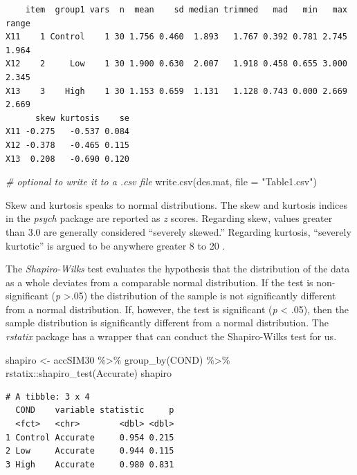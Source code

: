 \documentclass[
  11pt,
]{book}
\newenvironment{Shaded}{\begin{snugshade}}{\end{snugshade}}
\newcommand{\AttributeTok}[1]{\textcolor[rgb]{0.77,0.63,0.00}{#1}}
\newcommand{\CommentTok}[1]{\textcolor[rgb]{0.56,0.35,0.01}{\textit{#1}}}
\newcommand{\FunctionTok}[1]{\textcolor[rgb]{0.00,0.00,0.00}{#1}}
\newcommand{\NormalTok}[1]{#1}
\newcommand{\OtherTok}[1]{\textcolor[rgb]{0.56,0.35,0.01}{#1}}
\newcommand{\SpecialCharTok}[1]{\textcolor[rgb]{0.00,0.00,0.00}{#1}}
\newcommand{\StringTok}[1]{\textcolor[rgb]{0.31,0.60,0.02}{#1}}
\begin{document}
\begin{verbatim}
    item  group1 vars  n  mean    sd median trimmed   mad   min   max range
X11    1 Control    1 30 1.756 0.460  1.893   1.767 0.392 0.781 2.745 1.964
X12    2     Low    1 30 1.900 0.630  2.007   1.918 0.458 0.655 3.000 2.345
X13    3    High    1 30 1.153 0.659  1.131   1.128 0.743 0.000 2.669 2.669
      skew kurtosis    se
X11 -0.275   -0.537 0.084
X12 -0.378   -0.465 0.115
X13  0.208   -0.690 0.120
\end{verbatim}

\begin{Shaded}
\begin{Highlighting}[]
\CommentTok{\# optional to write it to a .csv file}
\FunctionTok{write.csv}\NormalTok{(des.mat, }\AttributeTok{file =} \StringTok{"Table1.csv"}\NormalTok{)}
\end{Highlighting}
\end{Shaded}

Skew and kurtosis speaks to normal distributions. The skew and kurtosis indices in the \emph{psych} package are reported as \emph{z} scores. Regarding skew, values greater than 3.0 are generally considered ``severely skewed.'' Regarding kurtosis, ``severely kurtotic'' is argued to be anywhere greater 8 to 20 \citep{kline_principles_2016}.

The \emph{Shapiro-Wilks} test evaluates the hypothesis that the distribution of the data as a whole deviates from a comparable normal distribution. If the test is non-significant (\emph{p} \textgreater.05) the distribution of the sample is not significantly different from a normal distribution. If, however, the test is significant (\emph{p} \textless{} .05), then the sample distribution is significantly different from a normal distribution. The \emph{rstatix} package has a wrapper that can conduct the Shapiro-Wilks test for us.

\begin{Shaded}
\begin{Highlighting}[]
\NormalTok{shapiro }\OtherTok{\textless{}{-}}\NormalTok{ accSIM30 }\SpecialCharTok{\%\textgreater{}\%}
    \FunctionTok{group\_by}\NormalTok{(COND) }\SpecialCharTok{\%\textgreater{}\%}
\NormalTok{    rstatix}\SpecialCharTok{::}\FunctionTok{shapiro\_test}\NormalTok{(Accurate)}
\NormalTok{shapiro}
\end{Highlighting}
\end{Shaded}

\begin{verbatim}
# A tibble: 3 x 4
  COND    variable statistic     p
  <fct>   <chr>        <dbl> <dbl>
1 Control Accurate     0.954 0.215
2 Low     Accurate     0.944 0.115
3 High    Accurate     0.980 0.831
\end{verbatim}
\end{document}
